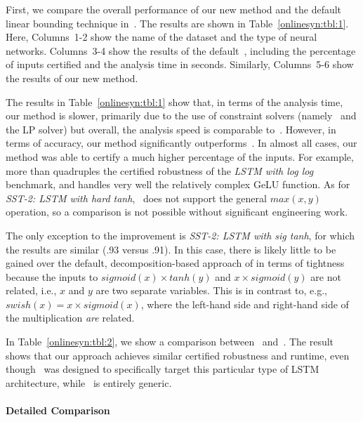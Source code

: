 First, we compare the overall performance of our new method and the
default linear bounding technique in~\autolipra{}.  The results are shown
in Table~\ref{onlinesyn:tbl:1}.  Here, Columns~1-2 show the name of the dataset
and the type of neural networks.  Columns~3-4 show the results of the
default~\autolipra{}, including the percentage of inputs certified and
the analysis time in seconds.  Similarly, Columns~5-6 show the results
of our new method.

The results in Table~\ref{onlinesyn:tbl:1} show that, in terms of the analysis
time,
our method is slower, primarily due to the use of constraint solvers (namely~\dReal{} and
the LP solver) but overall, the analysis speed is
comparable to~\autolipra{}.
%
However, in terms of accuracy, our method significantly
outperforms~\autolipra{}.  In almost all
cases, our method was able to certify a much higher percentage of the inputs.
For example,~\Name{} more than quadruples the certified robustness of the
\emph{LSTM with log log} benchmark, and handles very well the relatively
complex GeLU function.
%
As for \emph{SST-2: LSTM with hard tanh},~\autolipra{} does not support the
general $ max(x, y) $ operation, so a comparison is not possible without
significant engineering work.

The only exception to the improvement is \emph{SST-2: LSTM with sig tanh},
for which the results are similar (.93 versus .91).
%
In this case, there is likely little to be gained over the default, decomposition-based approach of \autolipra{} in terms of tightness because
the inputs to $ sigmoid(x) \times tanh(y) $ and $ x \times sigmoid(y) $ are not
related, i.e., $ x $ and $ y
$ are two separate variables. This is in contrast to, e.g., $ swish(x) = x
\times sigmoid(x) $, where the left-hand side and right-hand side of the
multiplication \textit{are} related.
%

In Table~\ref{onlinesyn:tbl:2}, we show a comparison between~\Name{}
and~\popqorn{}. The
result shows that our approach achieves similar certified robustness and
runtime, even though~\popqorn{} was designed to specifically target this particular type of  LSTM architecture,
while~\Name{} is entirely generic.

\paragraph{Detailed Comparison}

